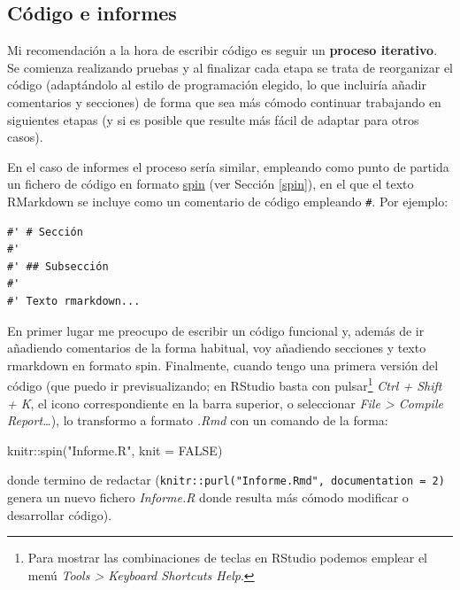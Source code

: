 \documentclass[
]{book}
\newenvironment{Shaded}{\begin{snugshade}}{\end{snugshade}}
\newcommand{\AttributeTok}[1]{\textcolor[rgb]{0.77,0.63,0.00}{#1}}
\newcommand{\ConstantTok}[1]{\textcolor[rgb]{0.00,0.00,0.00}{#1}}
\newcommand{\FunctionTok}[1]{\textcolor[rgb]{0.00,0.00,0.00}{#1}}
\newcommand{\NormalTok}[1]{#1}
\newcommand{\SpecialCharTok}[1]{\textcolor[rgb]{0.00,0.00,0.00}{#1}}
\newcommand{\StringTok}[1]{\textcolor[rgb]{0.31,0.60,0.02}{#1}}
\theoremstyle{break}
\theoremstyle{nonumberplain}
\begin{document}
\hypertarget{codigo}{%
\subsection{Código e informes}\label{codigo}}

Mi recomendación a la hora de escribir código es seguir un \textbf{proceso iterativo}.
Se comienza realizando pruebas y al finalizar cada etapa se trata de reorganizar el código (adaptándolo al estilo de programación elegido, lo que incluiría añadir comentarios y secciones) de forma que sea más cómodo continuar trabajando en siguientes etapas (y si es posible que resulte más fácil de adaptar para otros casos).

En el caso de informes el proceso sería similar, empleando como punto de partida un fichero de código en formato \href{https://yihui.org/knitr/demo/stitch/\#spin-comment-out-texts}{spin} (ver Sección \ref{spin}), en el que el texto RMarkdown se incluye como un comentario de código empleando \texttt{\#\textquotesingle{}}. Por ejemplo:

\begin{verbatim}
#' # Sección
#'
#' ## Subsección
#'
#' Texto rmarkdown...
\end{verbatim}

En primer lugar me preocupo de escribir un código funcional y, además de ir añadiendo comentarios de la forma habitual, voy añadiendo secciones y texto rmarkdown en formato spin.
Finalmente, cuando tengo una primera versión del código (que puedo ir previsualizando; en RStudio basta con pulsar\footnote{Para mostrar las combinaciones de teclas en RStudio podemos emplear el menú \emph{Tools \textgreater{} Keyboard Shortcuts Help}.} \emph{Ctrl + Shift + K}, el icono correspondiente en la barra superior, o seleccionar \emph{File \textgreater{} Compile Report\ldots{}}), lo transformo a formato \emph{.Rmd} con un comando de la forma:

\begin{Shaded}
\begin{Highlighting}[]
\NormalTok{knitr}\SpecialCharTok{::}\FunctionTok{spin}\NormalTok{(}\StringTok{"Informe.R"}\NormalTok{, }\AttributeTok{knit =} \ConstantTok{FALSE}\NormalTok{)}
\end{Highlighting}
\end{Shaded}

donde termino de redactar (\texttt{knitr::purl("Informe.Rmd",\ documentation\ =\ 2)} genera un nuevo fichero \emph{Informe.R} donde resulta más cómodo modificar o desarrollar código).
\end{document}
